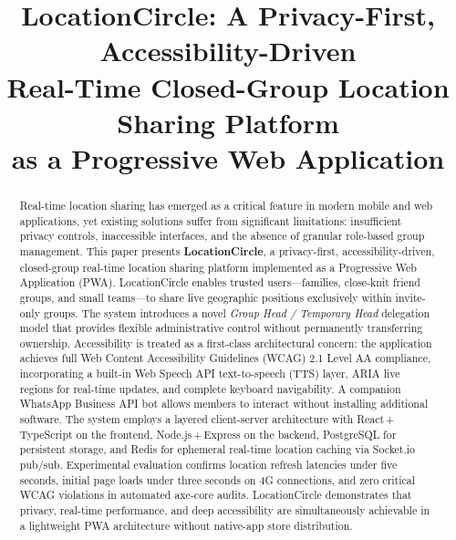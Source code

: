 \documentclass[conference]{IEEEtran}
\begin{document}
\title{LocationCircle: A Privacy-First, Accessibility-Driven\\
Real-Time Closed-Group Location Sharing Platform\\
as a Progressive Web Application}

\author{
}

\maketitle

\begin{abstract}
Real-time location sharing has emerged as a critical feature in
modern mobile and web applications, yet existing solutions suffer
from significant limitations: insufficient privacy controls,
inaccessible interfaces, and the absence of granular role-based
group management. This paper presents \textbf{LocationCircle}, a
privacy-first, accessibility-driven, closed-group real-time location
sharing platform implemented as a Progressive Web Application (PWA).
LocationCircle enables trusted users—families, close-knit friend
groups, and small teams—to share live geographic positions
exclusively within invite-only groups. The system introduces a novel
\emph{Group Head / Temporary Head} delegation model that provides
flexible administrative control without permanently transferring
ownership. Accessibility is treated as a first-class architectural
concern: the application achieves full Web Content Accessibility
Guidelines (WCAG) 2.1 Level AA compliance, incorporating a built-in
Web Speech API text-to-speech (TTS) layer, ARIA live regions for
real-time updates, and complete keyboard navigability. A companion
WhatsApp Business API bot allows members to interact without
installing additional software. The system employs a layered
client-server architecture with React\,+\,TypeScript on the
frontend, Node.js\,+\,Express on the backend, PostgreSQL for
persistent storage, and Redis for ephemeral real-time location
caching via Socket.io pub/sub. Experimental evaluation confirms
location refresh latencies under five seconds, initial page loads
under three seconds on 4G connections, and zero critical WCAG
violations in automated axe-core audits. LocationCircle demonstrates
that privacy, real-time performance, and deep accessibility are
simultaneously achievable in a lightweight PWA architecture without
native-app store distribution.
\end{abstract}
\end{document}
